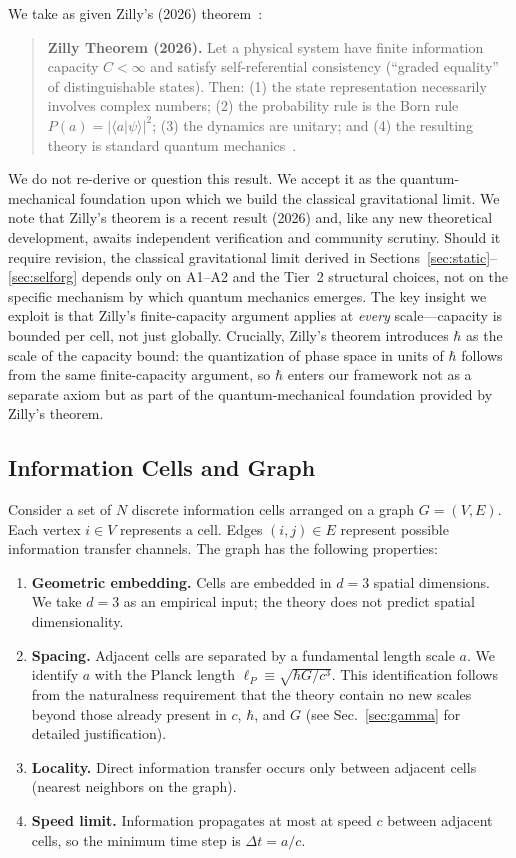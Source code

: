 \documentclass[aps,prd,twocolumn,showpacs,superscriptaddress,preprintnumbers]{revtex4-2}
\begin{document}
We take as given Zilly's (2026) theorem~\cite{Zilly:2026}:

\begin{quote}
\textbf{Zilly Theorem (2026).} Let a physical system have finite information capacity $C<\infty$ and satisfy self-referential consistency (``graded equality'' of distinguishable states). Then: (1) the state representation necessarily involves complex numbers; (2) the probability rule is the Born rule $P(a)=|\langle a|\psi\rangle|^2$; (3) the dynamics are unitary; and (4) the resulting theory is standard quantum mechanics~\cite{Zilly:2026}.
\end{quote}

We do not re-derive or question this result.
We accept it as the quantum-mechanical foundation upon which we build the classical gravitational limit.
We note that Zilly's theorem is a recent result (2026) and, like any new theoretical development, awaits independent verification and community scrutiny.
Should it require revision, the classical gravitational limit derived in Sections~\ref{sec:static}--\ref{sec:selforg} depends only on A1--A2 and the Tier~2 structural choices, not on the specific mechanism by which quantum mechanics emerges.
The key insight we exploit is that Zilly's finite-capacity argument applies at \emph{every} scale---capacity is bounded per cell, not just globally.
Crucially, Zilly's theorem introduces $\hbar$ as the scale of the capacity bound: the quantization of phase space in units of $\hbar$ follows from the same finite-capacity argument, so $\hbar$ enters our framework not as a separate axiom but as part of the quantum-mechanical foundation provided by Zilly's theorem.

\subsection{Information Cells and Graph}

Consider a set of $N$ discrete information cells arranged on a graph $G=(V,E)$.
Each vertex $i\in V$ represents a cell.
Edges $(i,j)\in E$ represent possible information transfer channels.
The graph has the following properties:

\begin{enumerate}
    \item \textbf{Geometric embedding.} Cells are embedded in $d=3$ spatial dimensions. We take $d=3$ as an empirical input; the theory does not predict spatial dimensionality.
    \item \textbf{Spacing.} Adjacent cells are separated by a fundamental length scale $a$. We identify $a$ with the Planck length $\ell_P\equiv\sqrt{\hbar G/c^3}$. This identification follows from the naturalness requirement that the theory contain no new scales beyond those already present in $c$, $\hbar$, and $G$ (see Sec.~\ref{sec:gamma} for detailed justification).
    \item \textbf{Locality.} Direct information transfer occurs only between adjacent cells (nearest neighbors on the graph).
    \item \textbf{Speed limit.} Information propagates at most at speed $c$ between adjacent cells, so the minimum time step is $\Delta t = a/c$.
\end{enumerate}
\end{document}
